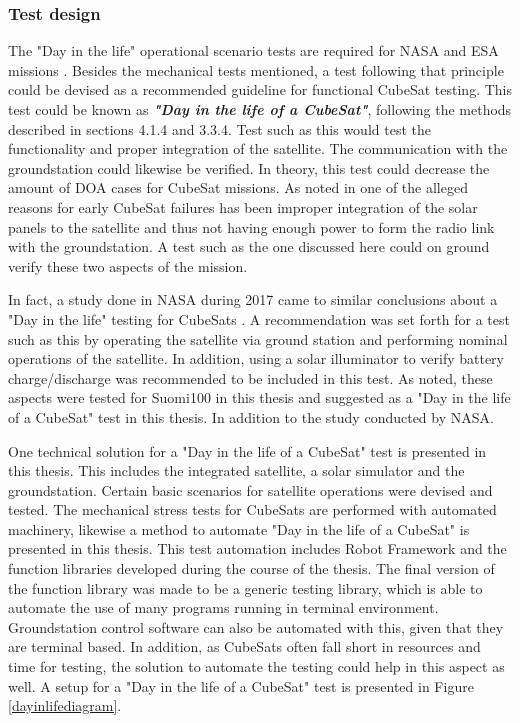 \documentclass[english,12pt,a4paper,pdftex,elec,utf8]{aaltothesis}
\begin{document}
\subsubsection{Test design}
The "Day in the life" operational scenario tests are required for NASA and ESA missions \cite{tor}. Besides the mechanical tests mentioned, a test following that principle could be devised as a recommended guideline for functional CubeSat testing. This test could be known as \textbf{\textit{"Day in the life of a CubeSat"}}, following the methods described in sections 4.1.4 and 3.3.4. Test such as this would test the functionality and proper integration of the satellite. The communication with the groundstation could likewise be verified. In theory, this test could decrease the amount of DOA cases for CubeSat missions. As noted in \cite{Langer, Swart1} one of the alleged reasons for early CubeSat failures has been improper integration of the solar panels to the satellite and thus not having enough power to form the radio link with the groundstation. A test such as the one discussed here could on ground verify these two aspects of the mission.\par
In fact, a study done in NASA during 2017 came to similar conclusions about a "Day in the life" testing for CubeSats \cite{improvingcubesatsuccess}. A recommendation was set forth for a test such as this by operating the satellite via ground station and performing nominal operations of the satellite. In addition, using a solar illuminator to verify battery charge/discharge was recommended to be included in this test. As noted, these aspects were tested for Suomi100 in this thesis and suggested as a "Day in the life of a CubeSat" test in this thesis. In addition to the study conducted by NASA.\par  
One technical solution for a "Day in the life of a CubeSat" test is presented in this thesis. This includes the integrated satellite, a solar simulator and the groundstation. Certain basic scenarios for satellite operations were devised and tested. The mechanical stress tests for CubeSats are performed with automated machinery, likewise a method to automate "Day in the life of a CubeSat" is presented in this thesis. This test automation includes Robot Framework and the function libraries developed during the course of the thesis. The final version of the function library was made to be a generic testing library, which is able to automate the use of many programs running in terminal environment. Groundstation control software can also be automated with this, given that they are terminal based. In addition, as CubeSats often fall short in resources and time for testing, the solution to automate the testing could help in this aspect as well. A setup for a "Day in the life of a CubeSat" test is presented in Figure \ref{dayinlifediagram}.\par
\end{document}
